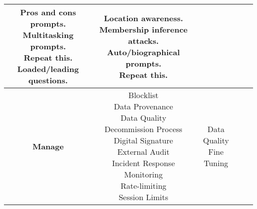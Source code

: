 \documentclass[fleqn]{article}
\begin{document}
\begin{landscape}
\begin{table}[H]
\begin{tabular}{|c|c|c|c|c|}
{			\textbullet\hspace{3pt} Pros and cons prompts. \\
			\textbullet\hspace{3pt} Multitasking prompts. \\ 
			\textbullet\hspace{3pt} Repeat this. \\ 
			\textbullet\hspace{3pt} Loaded/leading questions. \\ 
		}   
		& \makecell[l]{
			\textbullet\hspace{3pt} Location awareness. \\ 
			\textbullet\hspace{3pt} Membership inference attacks. \\ 
			\textbullet\hspace{3pt} Auto/biographical prompts. \\ 
			\textbullet\hspace{3pt} Repeat this. \\
		}
		\\
		\hline
		\textbf{Manage} & \makecell[l]{
			\textbullet\hspace{3pt} Blocklist \\
			\textbullet\hspace{3pt} Data Provenance\\
			\textbullet\hspace{3pt} Data Quality\\  	 
			\textbullet\hspace{3pt} Decommission Process\\ 
			\textbullet\hspace{3pt} Digital Signature\\ 	
			\textbullet\hspace{3pt} External Audit\\ 
			\textbullet\hspace{3pt} Incident Response\\ 
			\textbullet\hspace{3pt} Monitoring\\ 	
			\textbullet\hspace{3pt} Rate-limiting \\ 	
			\textbullet\hspace{3pt} Session Limits\\ 						 	 
		} 
		& \makecell[l]{
			\textbullet\hspace{3pt} Data Quality\\ 
			\textbullet\hspace{3pt} Fine Tuning\\ 	
}
\end{tabular}
\end{table}
\end{landscape}
\end{document}
